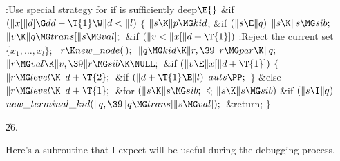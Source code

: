 \Y\B\4:Use special strategy for  if  is sufficiently
deep\X${}\E{}$\6
\&{if} ${}(\|x[\|d]\G\\{dd}-\T{1}\W\|d<\|l){}$\5
${}\{{}$\1\6
${}\|s\K\|p\MG\\{kid}{}$;\5
\&{if} ${}(\|s\E\|q){}$\1\5
${}\|s\K\|s\MG\\{sib};{}$\2\6
${}\|v\K\|q\MG\\{trans}[\|s\MG\\{val}];{}$\6
\&{if} ${}(\|v<\|x[\|d+\T{1}]){}$\1\5
:Reject the current set $\{x_1,\ldots,x_l\}$\X;\2\6
${}\|r\K\\{new\_node}(\,);{}$\6
${}\|q\MG\\{kid}\K\|r,\39\|r\MG\\{par}\K\|q;{}$\6
${}\|r\MG\\{val}\K\|v,\39\|r\MG\\{sib}\K\NULL;{}$\6
\&{if} ${}(\|v\E\|x[\|d+\T{1}]){}$\5
${}\{{}$\1\6
${}\|r\MG\\{level}\K\|d+\T{2};{}$\6
\&{if} ${}(\|d+\T{1}\E\|l){}$\1\5
${}\\{auts}\PP;{}$\2\6
\4${}\}{}$\5
\2\&{else}\1\5
${}\|r\MG\\{level}\K\|d+\T{1};{}$\2\6
\&{for} ${}(\|s\K\|s\MG\\{sib};{}$ \|s; ${}\|s\K\|s\MG\\{sib}){}$\1\6
\&{if} ${}(\|s\I\|q){}$\1\5
${}\\{new\_terminal\_kid}(\|q,\39\|q\MG\\{trans}[\|s\MG\\{val}]);{}$\2\2\6
\&{return};\6
\4${}\}{}$\2\par
\U26.\fi

Here's a subroutine that I expect will be useful during the debugging
process.

